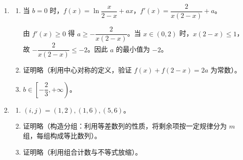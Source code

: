 \documentclass[12pt,a4paper]{article}
\begin{document}
\begin{enumerate}[label=\arabic*.]
\item 
\begin{enumerate}[label=(\arabic*)]
\item 当 $b=0$ 时，$f(x)=\ln\dfrac{x}{2-x}+ax$，$f'(x)=\dfrac{2}{x(2-x)}+a$。

由 $f'(x)\geqslant 0$ 得 $a\geqslant -\dfrac{2}{x(2-x)}$。当 $x\in(0,2)$ 时，$x(2-x)\leqslant 1$，故 $-\dfrac{2}{x(2-x)}\leqslant -2$。因此 $a$ 的最小值为 $-2$。

\item 证明略（利用中心对称的定义，验证 $f(x)+f(2-x)=2a$ 为常数）。

\item $b\in\left[-\dfrac{2}{3},+\infty\right)$。
\end{enumerate}

\item 
\begin{enumerate}[label=(\arabic*)]
\item $(i,j)=(1,2),(1,6),(5,6)$。
\item 证明略（构造分组：利用等差数列的性质，将剩余项按一定规律分为 $m$ 组，每组构成等比数列）。
\item 证明略（利用组合计数与不等式放缩）。
\end{enumerate}

\end{enumerate}
\end{document}
